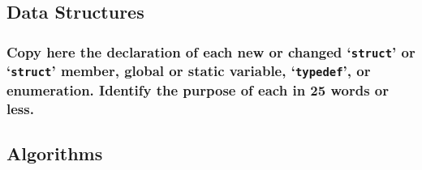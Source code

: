 \documentclass[sigconf, nonacm]{acmart}
\begin{document}
        \subsection{Data Structures}
            
            \subsubsection{Copy here the declaration of each new or changed `\texttt{struct}' or `\texttt{struct}' member, global or static variable, `\texttt{typedef}', or enumeration. Identify the purpose of each in 25 words or less. } 

        \subsection{Algorithms}
\end{document}
